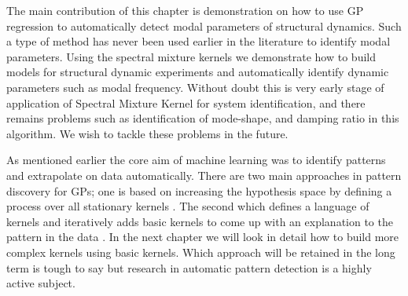 The main contribution of this chapter is demonstration on how to use GP regression to automatically detect modal parameters of structural dynamics. Such a type of method has never been used earlier in the literature to identify modal parameters. Using the spectral mixture kernels we demonstrate how to build models for structural dynamic experiments and automatically identify dynamic parameters such as modal frequency. Without doubt this is very early stage of application of Spectral Mixture Kernel for system identification, and there remains problems such as identification of mode-shape, and damping ratio in this algorithm. We wish to tackle these problems in the future. 

As mentioned earlier the core aim of machine learning was to identify patterns and extrapolate on data automatically. There are two main approaches in pattern discovery for GPs; one is based on increasing the hypothesis space by defining a process over all stationary kernels \cite{wilson2012process}. The second which defines a language of kernels and iteratively adds basic kernels to come up with an explanation to the pattern in the data \cite{lloyd2014automatic}. In the next chapter we will look in detail how to build more complex kernels using basic kernels. Which approach will be retained in the long term is tough to say but research in automatic pattern detection is a highly active subject. 


